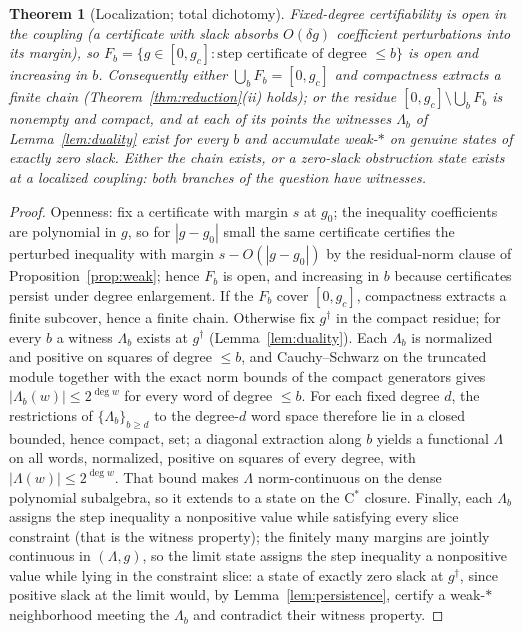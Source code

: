 \documentclass[11pt]{article}
\newtheorem{theorem}{Theorem}[section]
\theoremstyle{definition}
\theoremstyle{remark}
\begin{document}
\begin{theorem}[Localization; total dichotomy]\label{thm:totaldichotomy}
Fixed-degree certifiability is open in the coupling (a certificate with
slack absorbs $O(\delta g)$ coefficient perturbations into its margin),
so $F_b = \{g \in [0, g_c] : \text{step certificate of degree } \le b\}$
is open and increasing in $b$.  Consequently either $\bigcup_b F_b =
[0, g_c]$ and compactness extracts a finite chain
(Theorem~\ref{thm:reduction}(ii) holds); or the residue $[0,g_c]
\setminus \bigcup_b F_b$ is nonempty and compact, and at each of its
points the witnesses $\Lambda_b$ of Lemma~\ref{lem:duality} exist for
every $b$ and accumulate weak-$*$ on genuine states of exactly zero
slack.  Either the chain exists, or a zero-slack obstruction state
exists at a localized coupling: both branches of the question have
witnesses.
\end{theorem}
\begin{proof}
Openness: fix a certificate with margin $s$ at $g_0$; the inequality
coefficients are polynomial in $g$, so for $|g - g_0|$ small the same
certificate certifies the perturbed inequality with margin
$s - O(|g - g_0|)$ by the residual-norm clause of
Proposition~\ref{prop:weak}; hence $F_b$ is open, and increasing in $b$
because certificates persist under degree enlargement.  If the $F_b$
cover $[0, g_c]$, compactness extracts a finite subcover, hence a
finite chain.  Otherwise fix $g^\dagger$ in the compact residue; for
every $b$ a witness $\Lambda_b$ exists at $g^\dagger$
(Lemma~\ref{lem:duality}).  Each $\Lambda_b$ is normalized and positive
on squares of degree $\le b$, and Cauchy--Schwarz on the truncated
module together with the exact norm bounds of the compact generators
gives $|\Lambda_b(w)| \le 2^{\deg w}$ for every word of degree
$\le b$.  For each fixed degree $d$, the restrictions of
$\{\Lambda_b\}_{b \ge d}$ to the degree-$d$ word space therefore lie in
a closed bounded, hence compact, set; a diagonal extraction along $b$
yields a functional $\Lambda$ on all words, normalized, positive on
squares of every degree, with $|\Lambda(w)| \le 2^{\deg w}$.  That
bound makes $\Lambda$ norm-continuous on the dense polynomial
subalgebra, so it extends to a state on the C$^*$ closure.  Finally,
each $\Lambda_b$ assigns the step inequality a nonpositive value while
satisfying every slice constraint (that is the witness property); the
finitely many margins are jointly continuous in $(\Lambda, g)$, so the
limit state assigns the step inequality a nonpositive value while lying
in the constraint slice: a state of exactly zero slack at
$g^\dagger$, since positive slack at the limit would, by
Lemma~\ref{lem:persistence}, certify a weak-$*$ neighborhood meeting
the $\Lambda_b$ and contradict their witness property.
\end{proof}
\end{document}
